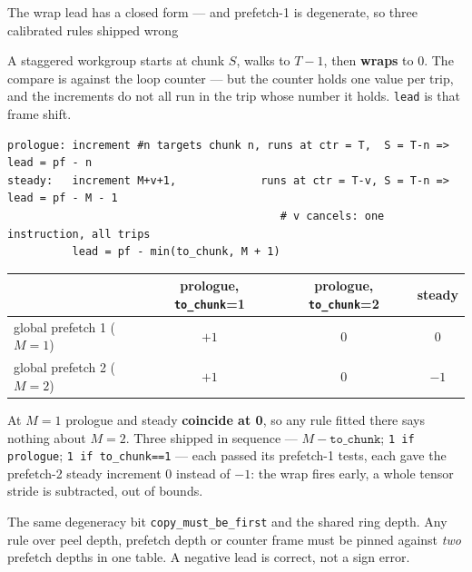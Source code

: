 \documentclass[aspectratio=169,9pt]{beamer}
\newcommand{\tsub}[1]{{\footnotesize\color{gray}#1}}
\newcommand{\key}[1]{\textcolor{acc}{\textbf{#1}}}
\newcommand{\bad}[1]{\textcolor{warn}{\textbf{#1}}}
\newcommand{\good}[1]{\textcolor{ok}{\textbf{#1}}}
\begin{document}
\begin{frame}[fragile]{The wrap lead has a closed form --- and prefetch-1 is degenerate, so three calibrated rules shipped wrong}

A staggered workgroup starts at chunk $S$, walks to $T-1$, then \key{wraps} to 0. The compare is
against the loop counter --- but the counter holds one value per trip, and the increments do not all
run in the trip whose number it holds. \texttt{lead} is that frame shift.

\begin{lstlisting}[style=pseudo]
prologue: increment #n targets chunk n, runs at ctr = T,  S = T-n => lead = pf - n
steady:   increment M+v+1,             runs at ctr = T-v, S = T-n => lead = pf - M - 1
                                          # v cancels: one instruction, all trips
          lead = pf - min(to_chunk, M + 1)
\end{lstlisting}

\begin{center}\scriptsize
\begin{tabular}{lccc}
\toprule
 & prologue, \texttt{to\_chunk}=1 & prologue, \texttt{to\_chunk}=2 & steady \\
\midrule
global prefetch 1 ($M{=}1$) & $+1$ & $0$ & \bad{$0$} \\
global prefetch 2 ($M{=}2$) & $+1$ & $0$ & \good{$-1$} \\
\bottomrule
\end{tabular}
\end{center}

At $M{=}1$ prologue and steady \bad{coincide at 0}, so any rule fitted there says nothing about
$M{=}2$. Three shipped in sequence --- $M-\texttt{to\_chunk}$; \texttt{1 if prologue};
\texttt{1 if to\_chunk==1} --- each passed its prefetch-1 tests, each gave the prefetch-2 steady
increment $0$ instead of $-1$: the wrap fires early, a whole tensor stride is subtracted, out of bounds.

\tsub{The same degeneracy bit \texttt{copy\_must\_be\_first} and the shared ring depth. Any rule over peel depth, prefetch depth or counter frame must be pinned against \emph{two} prefetch depths in one table. A negative lead is correct, not a sign error.}
\end{frame}
\end{document}
